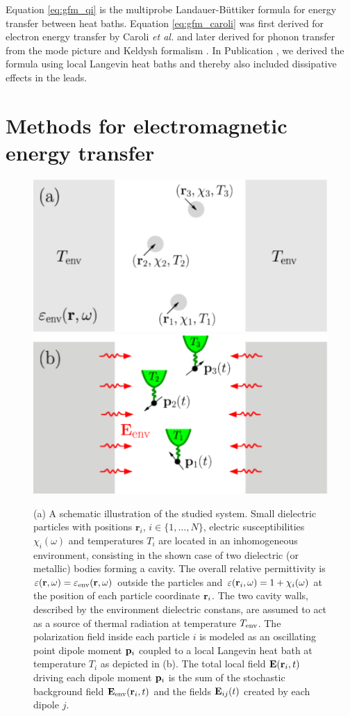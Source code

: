 Equation \eqref{eq:gfm_qi} is the multiprobe Landauer-B\"uttiker formula \cite{buttiker92} for energy transfer between heat baths. Equation \eqref{eq:gfm_caroli} was first derived for electron energy transfer by Caroli \textit{et al.} \cite{caroli71} and later derived for phonon transfer from the mode picture \cite{mingo06} and Keldysh formalism \cite{yamamoto06}. In Publication , we derived the formula using local Langevin heat baths and thereby also included dissipative effects in the leads.

\section{Methods for electromagnetic energy transfer}

\label{sec:em_methods}

\begin{figure}
 \includegraphics[width=.49\columnwidth]{pics/dipole_pic1a.pdf}
 \includegraphics[width=.49\columnwidth]{pics/dipole_pic1b.pdf}
 \caption{(a) A schematic illustration of the studied system. Small dielectric particles with positions $\mathbf{r}_i$, $i\in\{1,\dots,N\}$, electric susceptibilities $\chi_i(\omega)$ and temperatures $T_i$ are located in an inhomogeneous environment, consisting in the shown case of two dielectric (or metallic) bodies forming a cavity. The overall relative permittivity is $\varepsilon(\mathbf{r},\omega)=\varepsilon_{\textrm{env}}(\mathbf{r},\omega)$ outside the particles and $\varepsilon(\mathbf{r}_i,\omega)=1+\chi_i(\omega)$ at the position of each particle coordinate $\mathbf{r}_i$. The two cavity walls, described by the environment dielectric constans, are assumed to act as a source of thermal radiation at temperature $T_{\textrm{env}}$. The polarization field inside each particle $i$ is modeled as an oscillating point dipole moment $\mathbf{p}_i$ coupled to a local Langevin heat bath at temperature $T_i$ as depicted in (b). The total local field $\mathbf{E}(\mathbf{r}_i,t)$ driving each dipole moment $\mathbf{p}_i$ is the sum of the stochastic background field $\mathbf{E}_{\textrm{env}}(\mathbf{r}_i,t)$ and the fields $\mathbf{E}_{ij}(t)$ created by each dipole $j$.}%
\label{fig:gfm_dipole_system}
\end{figure}

